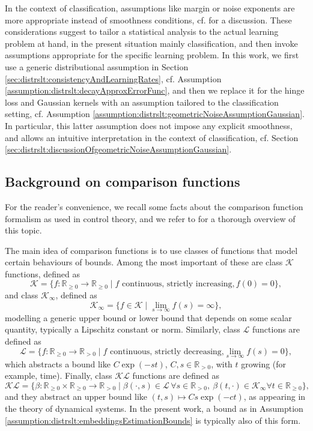 \documentclass[letterpaper]{article} %
\newcommand{\R}{\mathbb{R}}
\newcommand{\Rnn}{\R_{\geq 0}}
\newcommand{\Rp}{\R_{> 0}}
\newcommand{\cK}{\mathcal{K}} %
\newcommand{\cL}{\mathcal{L}} %
\newcommand{\cKi}{\cK_\infty} %
\newcommand{\cKL}{\mathcal{KL}} %
\begin{document}
In the context of classification, assumptions like margin or noise exponents are more appropriate instead of smoothness conditions, cf. \cite[Chapter~8]{SC08} for a discussion.
These considerations suggest to tailor a statistical analysis to the actual learning problem at hand, in the present situation mainly classification, and then invoke assumptions appropriate for the specific learning problem.
In this work, we first use a generic distributional assumption in Section \ref{sec:distrslt:consistencyAndLearningRates}, cf. Assumption \ref{assumption:distrslt:decayApproxErrorFunc}, and then we replace it for the hinge loss and Gaussian kernels with an assumption tailored to the classification setting, cf. Assumption \ref{assumption:distrslt:geometricNoiseAssumptionGaussian}.
In particular, this latter assumption does not impose any explicit smoothness, and allows an intuitive interpretation in the context of classification, cf. Section \ref{sec:distrslt:discussionOfgeometricNoiseAssumptionGaussian}.

\subsection{Background on comparison functions} \label{sec:distrslt:backgroundComparisonFunctions}
For the reader's convenience, we recall some facts about the comparison function formalism as used in control theory, and we refer to \cite{kellett2014compendium} for a thorough overview of this topic.

The main idea of comparison functions is to use classes of functions that model certain behaviours of bounds.
Among the most important of these are class $\cK$ functions, defined as
\begin{equation*}
    \cK=\{f:\Rnn\rightarrow\Rnn \mid f \text{ continuous, strictly increasing}, f(0)=0 \},
\end{equation*}
and class $\cKi$, defined as
\begin{equation*}
    \cKi=\{ f \in \cK \mid \lim_{s\rightarrow\infty} f(s) = \infty \},
\end{equation*}
modelling a generic upper bound or lower bound that depends on some scalar quantity, typically a Lipschitz constant or norm.
Similarly, class $\cL$ functions are defined as
\begin{equation*}
    \cL = \{ f: \Rnn \rightarrow \Rp \mid f \text{ continuous, strictly decreasing,} \lim_{s\rightarrow\infty} f(s)=0 \},
\end{equation*}
which abstracts a bound like $C \exp(-s t)$, $C,s\in\Rp$, with $t$ growing (for example, time).
Finally, class $\cKL$ functions are defined as
\begin{equation*}
    \cKL = \{ \beta: \Rnn\times\Rnn \rightarrow \Rp \mid \beta(\cdot,s) \in \cL \, \forall s\in\Rp,\: \beta(t,\cdot)\in\cKi \forall t \in \Rnn \},
\end{equation*}
and they abstract an upper bound like $(t,s) \mapsto Cs\exp(-ct)$, as appearing in the theory of dynamical systems.
In the present work, a bound as in Assumption \ref{assumption:distrslt:embeddingsEstimationBounds} is typically also of this form.
\end{document}
